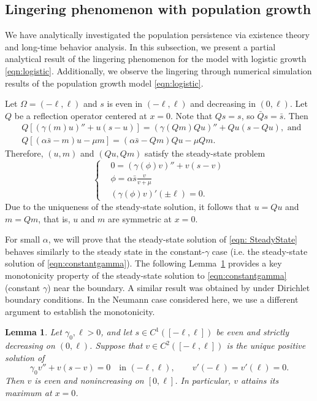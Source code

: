 \documentclass{article}
\newtheorem{lemma}[theorem]{Lemma}
\begin{document}
\subsection{Lingering phenomenon with population growth}
We have analytically investigated the population persistence via existence theory and long-time behavior analysis. In this subsection, we present a partial analytical result of the lingering phenomenon for the model with logistic growth \eqref{eqn:logistic}. Additionally,  we observe the lingering through numerical simulation results of the population growth model \eqref{eqn:logistic}.

Let $\Omega = (-\ell,\ell)$ and $s$ is even in $(-\ell,\ell)$ and decreasing in $(0,\ell)$. 
Let $Q$ be a reflection operator centered at $x=0$. Note that $Qs =s$, so $\bar Qs = \bar s$. Then 
\begin{align*}
    &Q\left[(\gamma(m)u)'' +u(s-u)\right]= (\gamma(Qm)Qu)'' +Qu(s-Qu), \text{ and }\\ 
    & Q[(\alpha\bar s -m)u -\mu m] = (\alpha \bar s -Qm)Qu -\mu Qm.
\end{align*} Therefore, $(u,m)$ and $(Qu,Qm)$ satisfy the steady-state problem 
\begin{equation}\label{eqn: SteadyState}
    \left\{\begin{aligned}
        &0 = (\gamma(\phi)v)''+ v (s - v)\\
        &\phi = \alpha \bar s \frac{v}{v+\mu}\\
        & (\gamma(\phi)v)'(\pm \ell) =0.
    \end{aligned}\right.
\end{equation} Due to the uniqueness of the steady-state solution, it follows that $u=Qu$ and $m=Qm$, that is, $u$ and $m$ are symmetric at $x=0$. 

For small $\alpha$, we will prove that the steady-state solution of \eqref{eqn: SteadyState} behaves similarly to the steady state in the constant-$\gamma$ case (i.e. the steady-state solution of \eqref{eqn:constantgamma}). The following Lemma~\ref{lem: even SS} provides a key monotonicity property of the steady-state solution to \eqref{eqn:constantgamma} (constant $\gamma$) near the boundary. A similar result was obtained by \cite{Gidas1979} under Dirichlet boundary conditions. In the Neumann case considered here, we use a different argument to establish the monotonicity.


\begin{lemma}\label{lem: even SS}
Let $\gamma_0,\ell>0$, and let $s\in C^1([-\ell,\ell])$ be even and strictly decreasing on $(0,\ell)$.
Suppose that $v\in C^2([-\ell,\ell])$ is the unique positive solution of
\begin{equation}\label{eqn: semilinear elliptic}
\gamma_0v''+v(s-v)=0 \quad\text{in }(-\ell,\ell),\qquad v'(-\ell)=v'(\ell)=0.
\end{equation}
Then $v$ is even and nonincreasing on $[0,\ell]$. In particular, $v$ attains its maximum at $x=0$.
\end{lemma}
\end{document}
